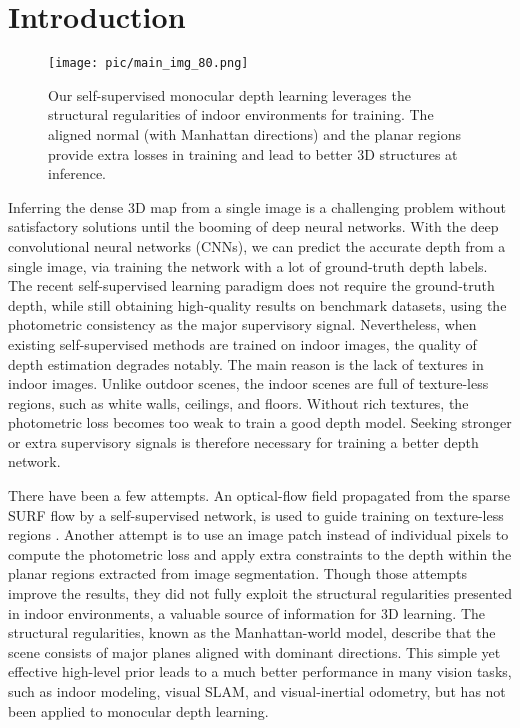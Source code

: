 \documentclass[10pt,twocolumn,letterpaper]{article}
\begin{document}
\section{Introduction}
\begin{figure}[ht]		
	\centering  
	\texttt{[image: pic/main\_img\_80.png]} 	\caption{Our self-supervised monocular depth learning leverages the structural regularities of indoor environments for training. The aligned normal (with Manhattan directions) and the planar regions provide extra losses in training and lead to better 3D structures at inference.}
	\label{fig:main}  
\end{figure}

Inferring the dense 3D map from a single image is a challenging problem without satisfactory solutions until the booming of deep neural networks. With the deep convolutional neural networks (CNNs), we can predict the accurate depth from a single image, via training the network with a lot of ground-truth depth labels. The recent self-supervised learning paradigm  does not require the ground-truth depth, while still obtaining high-quality results on benchmark datasets, using the photometric consistency as the major supervisory signal. Nevertheless, when existing self-supervised methods are trained on indoor images, the quality of depth estimation degrades notably\cite{zhou2019moving}\cite{bian2020unsupervised}. The main reason is the lack of textures in indoor images. Unlike outdoor scenes, the indoor scenes are full of texture-less regions, such as white walls, ceilings, and floors. Without rich textures, the photometric loss becomes too weak to train a good depth model. Seeking stronger or extra supervisory signals is therefore necessary for training a better depth network.

There have been a few attempts. An optical-flow field propagated from the sparse SURF\cite{bay2006surf} flow by a self-supervised network, is used to guide training on texture-less regions \cite{zhou2019moving}. Another attempt \cite{yu2020p} is to use an image patch instead of individual pixels to compute the photometric loss and apply extra constraints to the depth within the planar regions extracted from image segmentation. Though those attempts improve the results, they did not fully exploit the structural regularities presented in indoor environments, a valuable source of information for 3D learning. The structural regularities, known as the Manhattan-world model\cite{coughlan1999manhattan}, describe that the scene consists of major planes aligned with dominant directions. This simple yet effective high-level prior leads to a much better performance in many vision tasks, such as indoor modeling\cite{furukawa2009manhattan}\cite{furukawa2009reconstructing}\cite{concha2014manhattan}, visual SLAM\cite{zhou2015structslam}\cite{flint2010growing}\cite{yang2016pop}, and visual-inertial odometry\cite{zou2019structvio}, but has not been applied to monocular depth learning.
\end{document}
